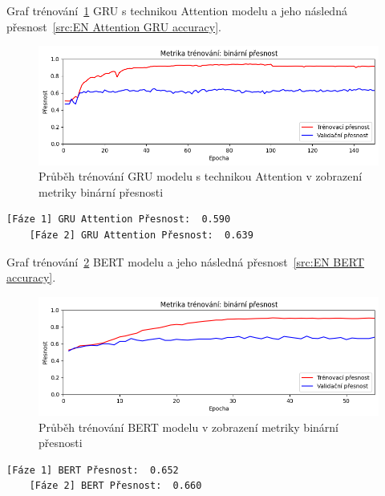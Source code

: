 Graf trénování~\ref{fig:EN Attention GRU model train} GRU s technikou Attention modelu a jeho následná přesnost~\ref{src:EN Attention GRU accuracy}.
\begin{figure}[H]
	\centering
	\includegraphics[width=1\textwidth]{Figures/EN_GRU_Attention_binarni_presnost.png}
	\caption{Průběh trénování GRU modelu s technikou Attention v zobrazení metriky binární přesnosti}\label{fig:EN Attention GRU model train}
\end{figure}
\begin{lstlisting}[label=src:EN Attention GRU accuracy, caption={Výsledek GRU modelu s technikou Attention na anglickém datasetu po trénování~\ref{fig:EN Attention GRU model train}}]
	[Fáze 1] GRU Attention Přesnost:  0.590
	[Fáze 2] GRU Attention Přesnost:  0.639
\end{lstlisting}

Graf trénování~\ref{fig:EN BERT model train} BERT modelu a jeho následná přesnost~\ref{src:EN BERT accuracy}.
\begin{figure}[H]
	\centering
	\includegraphics[width=1\textwidth]{Figures/EN_BERT_binarni_presnost.png}
	\caption{Průběh trénování BERT modelu v zobrazení metriky binární přesnosti}\label{fig:EN BERT model train}
\end{figure}
\begin{lstlisting}[label=src:EN BERT accuracy, caption={Výsledek BERT modelu na anglickém datasetu po trénování~\ref{fig:EN BERT model train}}]
	[Fáze 1] BERT Přesnost:  0.652
	[Fáze 2] BERT Přesnost:  0.660
\end{lstlisting}


